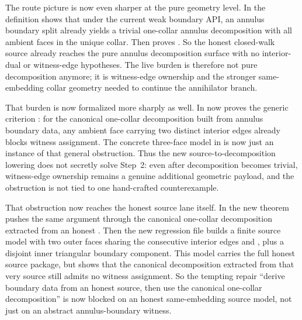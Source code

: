 \documentclass[11pt]{article}
\begin{document}
The route picture is now even sharper at the pure geometry level.  In
 the definition
 shows that under the
current weak boundary API, an annulus boundary split already yields a trivial
one-collar annulus decomposition with all ambient faces in the unique collar.
Then  proves
.
So the honest closed-walk source already reaches the pure annulus
decomposition surface with no interior-dual or witness-edge hypotheses.  The
live burden is therefore not pure decomposition anymore; it is witness-edge
ownership and the stronger same-embedding collar geometry needed to continue
the annihilator branch.

That burden is now formalized more sharply as well.  In
 now proves the generic
criterion
:
for the canonical one-collar decomposition built from annulus boundary data,
any ambient face carrying two distinct interior edges already blocks witness
assignment.  The concrete three-face model in
 is now just an
instance of that general obstruction.  Thus the new
source-to-decomposition lowering does not secretly solve Step~2: even after
decomposition becomes trivial, witness-edge ownership remains a genuine
additional geometric payload, and the obstruction is not tied to one
hand-crafted counterexample.

That obstruction now reaches the honest source lane itself.  In
 the new theorem
pushes the same argument through the canonical one-collar decomposition
extracted from an honest
.  Then the new regression
file  builds a
finite source model  with two outer
faces sharing the consecutive interior edges  and ,
plus a disjoint inner triangular boundary component.  This model carries the
full honest source package, but
shows that the canonical decomposition extracted from that very source still
admits no witness assignment.  So the tempting repair ``derive boundary data
from an honest source, then use the canonical one-collar decomposition'' is
now blocked on an honest same-embedding source model, not just on an abstract
annulus-boundary witness.
\end{document}
